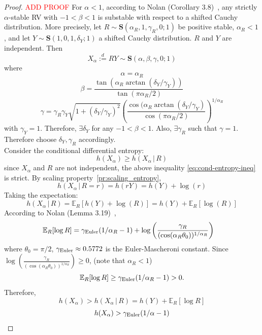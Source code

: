 \documentclass{article}
\theoremstyle{definition}
\begin{document}
\begin{proof}
\textcolor{red}{ADD PROOF}
For \(\alpha<1\), according to Nolan (Corollary 3.8)~\cite{NolanJohnP2020USDM}, any strictly \(\alpha\)-stable RV with \(-1<\beta<1\) is substable with respect to a shifted Cauchy distribution. More precisely, let \(R\sim\mathbf{S}(\alpha_R,1,\gamma_R,0;1)\) be positive stable, \(\alpha_R<1\), and let \(Y\sim\mathbf{S}(1,0,1,\delta_Y;1)\) a shifted Cauchy distribution. \(R\) and \(Y\) are independent. Then 
\[
X_\alpha\overset{d}{:=}RY\sim\mathbf{S}(\alpha,\beta,\gamma,0;1)
\] where
\[
\alpha=\alpha_R
\]
\[
\beta = \frac{\tan(\alpha_R\arctan(\delta_Y/\gamma_Y))}{\tan(\pi\alpha_R/2)}
\]
\[
\gamma=\gamma_R\gamma_Y\sqrt{1+(\delta_Y/\gamma_Y)^2}\left(\frac{\cos(\alpha_R \arctan(\delta_Y/\gamma_Y)}{\cos(\pi \alpha_R /2)}\right)^{1/\alpha_R}
\]
with \(\gamma_Y=1\). Therefore, \(\exists \delta_Y\) for any \(-1<\beta<1\). Also, \(\exists \gamma_R\) such that \(\gamma=1\). Therefore choose \(\delta_Y,\gamma_R\) accordingly.\\
Consider the conditional differential entropy:
\begin{equation}\label{eq:cond-entropy-ineq}
    h(X_\alpha) \ge h(X_\alpha\,|\,R)
\end{equation}
since \(X_\alpha\) and \(R\) are not independent, the above inequality \ref{eq:cond-entropy-ineq} is strict. By scaling property~\ref{pr:scaling_entropy},
\[
h(X_\alpha\,|\,R=r)=h(rY)=h(Y)+\log(r)
\]
Taking the expectation:
\[
h(X_\alpha\,|\,R) = \mathbb{E}_R[h(Y)+\log(R)]=h(Y)+\mathbb{E}_R[\log(R)]
\]
    According to Nolan (Lemma 3.19)~\cite{NolanJohnP2020USDM},
    \begin{align*}
    \mathbb{E}_R[\log R]&=\gamma_{\rm Euler} (1/\alpha_R-1)+\log\left(\frac{\gamma_R}{(\cos (\alpha_R\theta_0))^{1/\alpha_R}}\right)
    \end{align*}
where \(\theta_0=\pi/2\), \(\gamma_{\rm Euler}\approx0.5772\) is the Euler-Mascheroni constant. Since \(\log\left(\frac{\gamma_R}{(\cos (\alpha_R\theta_0))^{1/\alpha_R}}\right)\ge0\), (note that \(\alpha_R<1\))
\begin{equation}
    \mathbb{E}_R[\log R]\ge\gamma_{\rm Euler} (1/\alpha_R-1)>0.
\end{equation}
Therefore,
\begin{equation*}
     h(X_\alpha) > h(X_\alpha\,|\,R)=h(Y)+\mathbb{E}_R[\log R]   
\end{equation*}
\begin{equation}\label{eq:entropy-crude-lower-bound}
    h(X_\alpha) >\gamma_{\rm Euler} (1/\alpha-1)
\end{equation}


\end{proof}
\end{document}
